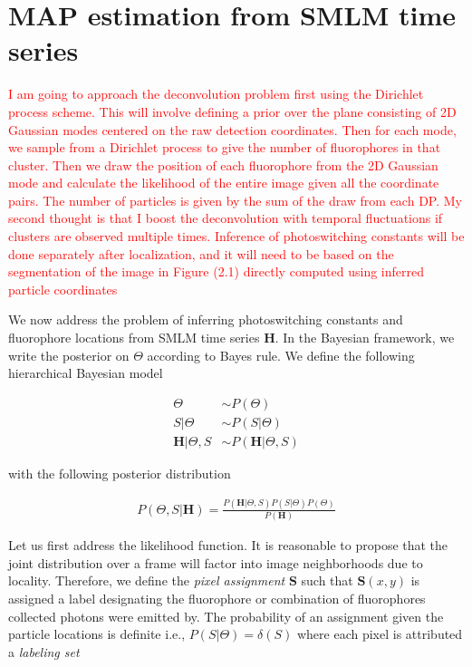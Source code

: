 \documentclass{ucetd}
\begin{document}
\section{MAP estimation from SMLM time series}

\textcolor{red}{I am going to approach the deconvolution problem first using the Dirichlet process scheme. This will involve defining a prior over the plane consisting of 2D Gaussian modes centered on the raw detection coordinates. Then for each mode, we sample from a Dirichlet process to give the number of fluorophores in that cluster. Then we draw the position of each fluorophore from the 2D Gaussian mode and calculate the likelihood of the entire image given all the coordinate pairs. The number of particles is given by the sum of the draw from each DP. My second thought is that I boost the deconvolution with temporal fluctuations if clusters are observed multiple times. Inference of photoswitching constants will be done separately after localization, and it will need to be based on the segmentation of the image in Figure (2.1) directly computed using inferred particle coordinates}


We now address the problem of inferring photoswitching constants and fluorophore locations from SMLM time series $\bm{H}$. In the Bayesian framework, we write the posterior on $\Theta$ according to Bayes rule. We define the following hierarchical Bayesian model

\begin{align*}
\Theta &\sim P(\Theta)\\
S|\Theta &\sim P(S|\Theta)\\
\bm{H}|\Theta,S &\sim P(\bm{H}|\Theta,S)
\end{align*}

with the following posterior distribution

\begin{align*}
P(\Theta,S|\bm{H}) = \frac{P(\bm{H}|\Theta,S)P(S|\Theta)P(\Theta)}{P(\bm{H})}
\end{align*}

Let us first address the likelihood function. It is reasonable to propose that the joint distribution over a frame will factor into image neighborhoods due to locality. Therefore, we define the \emph{pixel assignment} $\bm{S}$ such that $\bm{S}(x,y)$ is assigned a label designating the fluorophore or combination of fluorophores collected photons were emitted by. The probability of an assignment given the particle locations is definite i.e., $P(S|\Theta) = \delta(S)$ where each pixel is attributed a \emph{labeling set}
\end{document}
